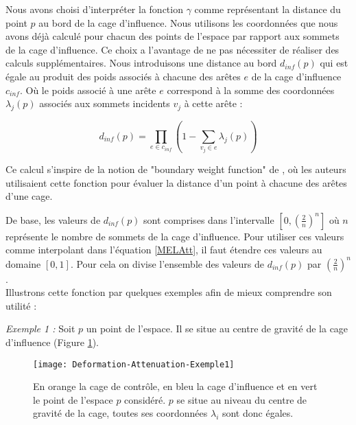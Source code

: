 Nous avons choisi d'interpréter la fonction $\gamma$ comme représentant la
distance du point $p$ au bord de la cage d'influence. Nous utilisons les
coordonnées que nous avons déjà calculé pour chacun des points de l'espace par
rapport aux sommets de la cage d'influence. Ce choix a l'avantage de ne pas
nécessiter de réaliser des calculs supplémentaires. Nous introduisons une
distance au bord $d_{inf}(p)$ qui est égale au produit des poids associés à
chacune des arêtes $e$ de la cage d'influence $c_{inf}$. Où le poids associé à
une arête $e$ correspond à la somme des coordonnées $\lambda_j(p)$ associés
aux sommets incidents $v_j$ à cette arête :

\begin{equation}
  d_{inf}(p) = \prod_{e \in c_{inf}} (1 - \sum_{v_j \in e} \lambda_j(p))
  \label{MELInf}
\end{equation}

Ce calcul s'inspire de la notion de "boundary weight function" de
\cite{GPCP13}, où les auteurs utilisaient cette fonction pour évaluer la
distance d'un point à chacune des arêtes d'une cage.

De base, les valeurs de $d_{inf}(p)$ sont comprises dans l'intervalle
$[0,(\frac{2}{n})^n]$ où $n$ représente le nombre de sommets de la cage
d'influence. Pour utiliser ces valeurs comme interpolant dans l'équation
\ref{MELAtt}, il faut étendre ces valeurs au domaine $[0,1]$. Pour cela on
divise l'ensemble des valeurs de $d_{inf}(p)$ par $(\frac{2}{n})^n$. \\

Illustrons cette fonction par quelques exemples afin de mieux comprendre son
utilité :

\textit{Exemple 1 :} Soit $p$ un point de l'espace. Il se situe au centre de
gravité de la cage d'influence (Figure \ref{MELEx1}).

\begin{figure}[ht]
\begin{center}
\texttt{[image: Deformation-Attenuation-Exemple1]}

\caption[Atténuation : Exemple 1] {En orange la cage de contrôle, en bleu la cage d'influence
et en vert le point de l'espace $p$ considéré. $p$ se situe au niveau du centre
de gravité de la cage, toutes ses coordonnées $\lambda_i$ sont donc égales.}

\label{MELEx1}
\end{center}
\end{figure}

